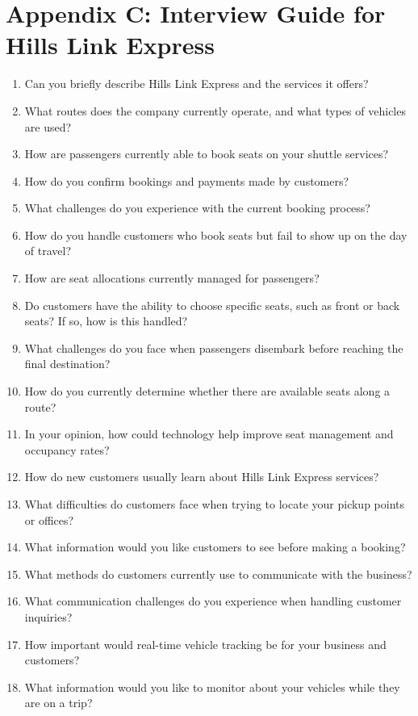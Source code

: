\section*{Appendix C: Interview Guide for Hills Link Express}

\begin{enumerate}
\item Can you briefly describe Hills Link Express and the services it offers?
\item What routes does the company currently operate, and what types of vehicles are used?
\item How are passengers currently able to book seats on your shuttle services?
\item How do you confirm bookings and payments made by customers?
\item What challenges do you experience with the current booking process?
\item How do you handle customers who book seats but fail to show up on the day of travel?
\item How are seat allocations currently managed for passengers?
\item Do customers have the ability to choose specific seats, such as front or back seats? If so, how is this handled?
\item What challenges do you face when passengers disembark before reaching the final destination?
\item How do you currently determine whether there are available seats along a route?
\item In your opinion, how could technology help improve seat management and occupancy rates?
\item How do new customers usually learn about Hills Link Express services?
\item What difficulties do customers face when trying to locate your pickup points or offices?
\item What information would you like customers to see before making a booking?
\item What methods do customers currently use to communicate with the business?
\item What communication challenges do you experience when handling customer inquiries?
\item How important would real-time vehicle tracking be for your business and customers?
\item What information would you like to monitor about your vehicles while they are on a trip?

\end{enumerate}
